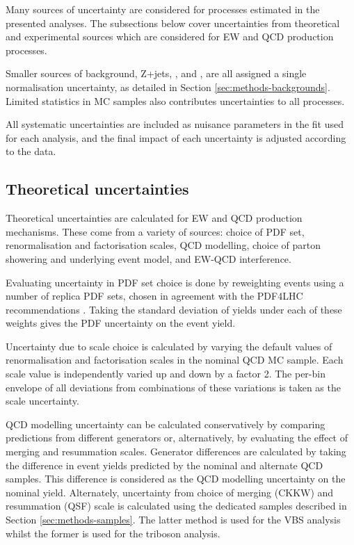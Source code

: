
Many sources of uncertainty are considered for processes estimated in the
presented analyses. The subsections below cover uncertainties from theoretical
and experimental sources which are considered for \ac{EW} and \ac{QCD} \Zyjj
production processes.

Smaller sources of background, Z+jets, \tty, and \WZjj, are all assigned a
single normalisation uncertainty, as detailed in Section
\ref{sec:methods-backgrounds}.
Limited statistics in \ac{MC} samples also contributes uncertainties to all
processes.

All systematic uncertainties are included as nuisance parameters in the fit used
for each analysis, and the final impact of each uncertainty is adjusted
according to the data.

\subsection{Theoretical uncertainties}
\label{sec:methods-systematics-theory}

Theoretical uncertainties are calculated for \ac{EW} and \ac{QCD} \Zy production
mechanisms. These come from a variety of sources: choice of \ac{PDF} set,
renormalisation and factorisation scales, \ac{QCD} modelling, choice of parton
showering and underlying event model, and \ac{EW}-\ac{QCD} interference.

Evaluating uncertainty in \ac{PDF} set choice is done by reweighting events
using a number of replica \ac{PDF} sets, chosen in agreement with the PDF4LHC
recommendations \cite{Butterworth2016}. Taking the standard deviation of yields
under each of these weights gives the \ac{PDF} uncertainty on the event yield. 

Uncertainty due to scale choice is calculated by varying the default values of
renormalisation and factorisation scales in the nominal QCD \Zy \ac{MC} sample.
Each scale value is independently varied up and down by a factor 2.
The per-bin envelope of all deviations from combinations of these variations
is taken as the scale uncertainty.

\ac{QCD} modelling uncertainty can be calculated conservatively by comparing
predictions from different generators or, alternatively, by evaluating the
effect of merging and resummation scales. Generator differences are calculated
by taking the difference in event yields predicted by the nominal and alternate
\ac{QCD} \Zy samples. This difference is considered as the \ac{QCD} modelling
uncertainty on the nominal yield.
Alternately, uncertainty from choice of merging (CKKW) and
resummation (QSF) scale is calculated using the dedicated samples described in
Section \ref{sec:methods-samples}. The latter method is used for the \ac{VBS}
analysis whilst the former is used for the triboson analysis.

